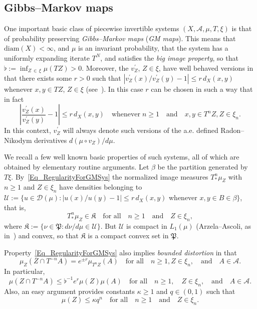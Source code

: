 \documentclass[AHL,Unicode,longabstracts]{cedram}
\newcommand{\clA}{\mathcal{A}}
\newcommand{\clD}{\mathcal{D}}
\newcommand{\clU}{\mathcal{U}}
\newcommand{\diam}{\mathrm{diam}}
\newcommand{\frkK}{\mathfrak{K}}
\newcommand{\frkP}{\mathfrak{P}}
\begin{document}
\subsection{Gibbs--Markov maps}
One important basic class of piecewise invertible systems $(X,\clA,\mu,T,\xi)$ is that of probability preserving \emph{Gibbs--Markov maps} (\emph{GM maps}). This means that $\diam (X)<\infty$, and $\mu$ is an invariant probability, that the system has a uniformly expanding iterate $T^{N}$, and satisfies the \emph{big image property}, so that $\flat:=\inf_{Z\,\in\,\xi}\mu(TZ)>0$. Moreover, the $v_{Z}^{\prime}$, $Z\in\xi$, have well behaved versions in that there exists some $r>0$ such that $\left\vert v_{Z}^{\prime}(x)/v_{Z}^{\prime }(y)-1\right\vert \leq r\,d_{X}(x,y)$ whenever $x,y\in TZ$, $Z\in\xi$ (see~\cite{AD}). In this case $r$ can be chosen in such a way that in fact
\begin{equation}\label{Eq_RegularityForGMSys}
\left\vert \frac{v_{Z}^{\prime}(x)}{v_{Z}^{\prime}(y)}-1\right\vert \leq r\,d_{X}(x,y) \quad\text{whenever}\;n\geq1\quad\text{and}\quad x,y\in T^{n}Z,Z\in
\xi_{n}. 
\end{equation}
In this context, $v_{Z}^{\prime}$ will always denote such versions of the a.e. defined Radon--Nikodym derivatives $d(\mu\circ v_{Z})/d\mu$.


We recall a few well known basic properties of such systems, all of which are obtained by elementary routine arguments. Let $\beta$ be the partition generated by $T\xi$. By~\eqref{Eq_RegularityForGMSys} the normalized image measures $T_{\ast}^{n}\mu_{Z}$ with $n\geq1$ and $Z\in\xi_{n}$ have densities belonging to $\clU:=\{u\in\clD(\mu):\vert u(x)/u(y)-1\vert \leq r\,d_{X}(x,y)$ whenever $x,y\in B\in\beta\}$, that is,
\begin{equation}\label{Eq_GMgoodK}
T_{\ast}^{n}\mu_{Z}\in\frkK\quad\text{for all}\quad n\geq1\quad\text{and}\quad Z\in\xi_{n},
\end{equation}
where $\frkK:=\{\nu\in\frkP:d\nu/d\mu\in\clU\}$. But $\clU$ is compact in $L_{1}(\mu)$ (Arzela--Ascoli, as in~\cite[\S~4.7]{A0}) and convex, so that $\frkK$ is a compact convex set in $\frkP$.

Property~\eqref{Eq_RegularityForGMSys} also implies \emph{bounded distortion} in that
\begin{equation}\label{Eq_AbstractAdlerInfty}
\mu_{Z}\left(Z\cap T^{-n}A\right)=e^{\pm r}\mu_{T^{n}Z}(A)\quad \text{for all}\quad n\geq1, Z\in\xi_{n}, \quad\text{and}\quad A\in\clA.
\end{equation}
In particular,
\begin{equation}\label{Eq_UpperDistortBound}
\mu\left(Z\cap T^{-n}A\right)\leq\flat^{-1}e^{r}\mu(Z)\mu(A) \quad\text{for all}\quad n\geq1,\quad Z\in\xi_{n},\quad\text{and}\quad A\in\clA.
\end{equation}
Also, an easy argument provides constants $\kappa\geq1$ and $q\in(0,1)$ such that
\begin{equation}\label{Eq_GMMapsContractionOfCylMeasure}
\mu(Z)\leq\kappa q^{n}\quad\text{for all}\quad n\geq1\quad\text{and}\quad Z\in\xi _{n}. 
\end{equation}
\end{document}
